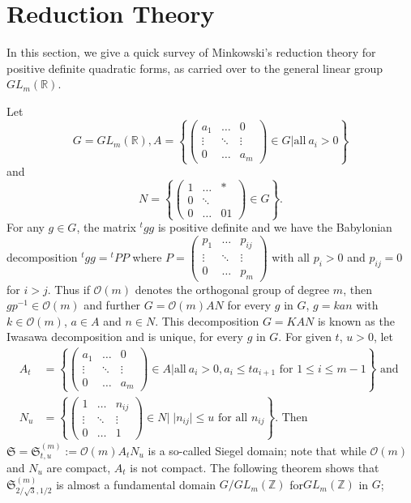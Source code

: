 \section{Reduction Theory}\label{c1:sec-1.2}\pageoriginale
In this section, we give a quick survey of Minkowski's reduction
theory for positive definite quadratic forms, as carried over to the
general linear group $GL_{m}(\mathbb{R})$.

Let
$$
G=GL_{m}(\mathbb{R}), A=
\left\{
\begin{pmatrix}
a_{1} & \ldots & 0\\
\vdots & \ddots & \vdots\\
0 & \ldots & a_{m}
\end{pmatrix}
\in G|\text{all} \ a_{i}>0\right\}
$$
and
$$
N=\left\{
\begin{pmatrix}
1 &\ldots & \ast\\
0 & \ddots & \\
0 & \ldots & 01
\end{pmatrix}
\in G\right\}.
$$
For any $g\in G$, the matrix ${}^{t}gg$ is positive definite and we
have the Babylonian decomposition ${}^{t}gg={}^{t}PP$ where
$P=\left(\begin{smallmatrix} p_{1} &\ldots & p_{ij}\\
\vdots & \ddots & \vdots\\
0 & \ldots & p_{m}\end{smallmatrix}\right)$ with all $p_{i}>0$ and
$p_{ij}=0$ for $i>j$. Thus if $\mathcal{O}(m)$ denotes the orthogonal
group of degree $m$, then $gp^{-1}\in \mathcal{O}(m)$ and further
$G=\mathcal{O}(m)AN$ \ie for every $g$ in $G$, $g=kan$ with
$k\in\mathcal{O}(m)$, $a\in A$ and $n\in N$. This decomposition
$G=KAN$ is known as the Iwasawa decomposition and is unique, for every
$g$ in $G$. For given $t$, $u>0$, let
{\fontsize{10}{12}\selectfont
\begin{align*}
A_{t} &= \left\{
\begin{pmatrix}
a_{1} &\ldots & 0\\
\vdots & \ddots & \vdots\\
0 & \ldots & a_{m}
\end{pmatrix}
\in A|\text{all} \ a_{i}>0, a_{i}\leq ta_{i+1}\text{ \ for \ } 1\leq
i\leq m-1\right\}\text{ \  and \ }\\
N_{u} &= \left\{
\begin{pmatrix}
1 & \ldots & n_{ij}\\
\vdots & \ddots & \vdots\\
0 & \ldots & 1
\end{pmatrix}
\in N| \; | n_{ij}|\leq u\text{ \  for all \ } n_{ij}\right\}. \text{ \ Then}
\end{align*}}
$\mathfrak{S}=\mathfrak{S}^{(m)}_{t,u}:=\mathcal{O}(m)A_{t}N_{u}$ is a
so-called Siegel domain; note that while $\mathcal{O}(m)$ and $N_{u}$
are compact, $A_{t}$ is not compact. The following theorem shows that
$\mathfrak{S}^{(m)}_{2/\sqrt{3},1/2}$ is almost a fundamental domain
$G/GL_{m}(\mathbb{Z})$ for\pageoriginale $GL_{m}(\mathbb{Z})$ in $G$;

